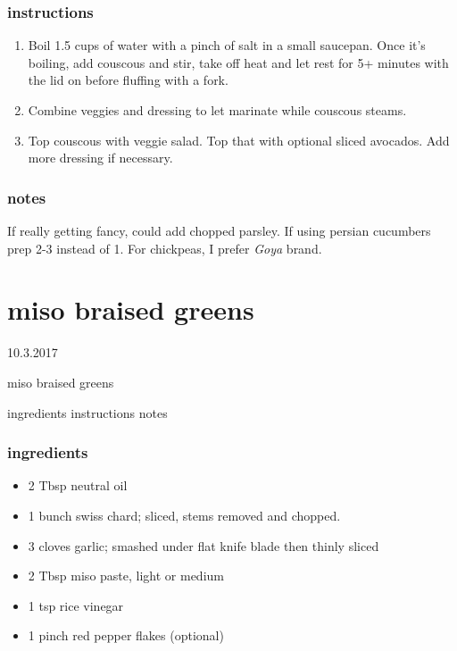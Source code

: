 \documentclass[]{book}
\providecommand{\tightlist}{%
  \setlength{\itemsep}{0pt}\setlength{\parskip}{0pt}}
\begin{document}
\hypertarget{instructions-3}{%
\subsection{instructions}\label{instructions-3}}

\begin{enumerate}
\def\labelenumi{\arabic{enumi}.}
\tightlist
\item
  Boil 1.5 cups of water with a pinch of salt in a small saucepan. Once it's boiling, add couscous and stir, take
  off heat and let rest for 5+ minutes with the lid on before fluffing with a fork.
\item
  Combine veggies and dressing to let marinate while couscous steams.
\item
  Top couscous with veggie salad. Top that with optional sliced avocados. Add more dressing if necessary.
\end{enumerate}

\hypertarget{notes-3}{%
\subsection{notes}\label{notes-3}}

If really getting fancy, could add chopped parsley. If using persian cucumbers prep 2-3 instead of 1. For chickpeas,
I prefer \emph{Goya} brand.

\hypertarget{miso-braised-greens}{%
\chapter{miso braised greens}\label{miso-braised-greens}}

10.3.2017

miso braised greens

ingredients \textbar{}
instructions \textbar{}
notes

\hypertarget{ingredients-4}{%
\subsection{ingredients}\label{ingredients-4}}

\begin{itemize}
\tightlist
\item
  2 Tbsp neutral oil
\item
  1 bunch swiss chard; sliced, stems removed and chopped.
\item
  3 cloves garlic; smashed under flat knife blade then thinly sliced
\item
  2 Tbsp miso paste, light or medium
\item
  1 tsp rice vinegar
\item
  1 pinch red pepper flakes (optional)
\end{itemize}
\end{document}

